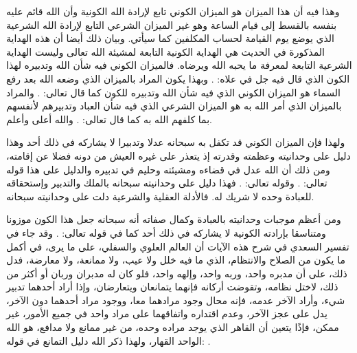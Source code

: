 وهذا فيه أن هذا الميزان هو الميزان الكوني تابع لإرادة الله الكونية وأن الله قائم عليه بنفسه بالقسط إلى قيام الساعة وهو غير الميزان الشرعي التابع لإرادة الله الشرعية الذي يوضع يوم القيامة لحساب المكلفين كما سيأتي. وبيان ذلك أيضا أن هذه الهداية المذكورة في الحديث هي الهداية الكونية التابعة لمشيئة الله تعالى وليست الهداية الشرعية التابعة لمعرفة ما يحبه الله ويرضاه. فالميزان الكوني فيه شأن الله وتدبيره لهذا الكون الذي قال فيه جل في علاه: \quranayah*[55][29]{\footnotesize \surahname*[55]}. وبهذا يكون المراد بالميزان الذي وضعه الله بعد رفع السماء هو الميزان الكوني الذي فيه شأن الله وتدبيره للكون كما قال تعالى: 
\quranayah*[55][7]{\footnotesize \surahname*[55]}. والمراد بالميزان الذي أمر الله به هو الميزان الشرعي الذي فيه شأن العباد وتدبيرهم لأنفسهم بما كلفهم الله به كما قال تعالى:
\quranayah*[55][8-9]{\footnotesize \surahname*[55]}. والله أعلى وأعلم.

ولهذا فإن الميزان الكوني قد تكفل به سبحانه عدلا وتدبيرا لا يشاركه في ذلك أحد وهذا دليل على وحدانيته وعظمته وقدرته إذ يتعذر على غيره العيش من دونه فضلا عن إقامته، ومن ذلك أن الله عدل في قضاءه ومشيئته وحليم في تدبيره والدليل على هذا قوله تعالى:
\quranayah*[35][41]{\footnotesize \surahname*[35]}. وقوله تعالى: \quranayah*[22][65]{\footnotesize \surahname*[22]}. فهذا دليل على وحدانيته سبحانه بالملك والتدبير وإستحقاقه للعبادة وحده لا شريك له. فالأدلة العقلية والشرعية دلت على وحدانيته سبحانه.

ومن أعظم موجبات وحدانيته بالعبادة وكمال صفاته أنه سبحانه جعل هذا الكون موزونا ومتناسقا بإرادته الكونية لا يشاركه في ذلك أحد كما في قوله تعالى: \quranayah*[21][22]{\footnotesize \surahname*[21]}. وقد جاء في تفسير السعدي في شرح هذه الآيات أن العالم العلوي والسفلي، على ما يرى، في أكمل ما يكون من الصلاح والانتظام، الذي ما فيه خلل ولا عيب، ولا ممانعة، ولا معارضة، فدل ذلك، على أن مدبره واحد، وربه واحد، وإلهه واحد، فلو كان له مدبران وربان أو أكثر من ذلك، لاختل نظامه، وتقوضت أركانه فإنهما يتمانعان ويتعارضان، وإذا أراد أحدهما تدبير شيء، وأراد الآخر عدمه، فإنه محال وجود مرادهما معا، ووجود مراد أحدهما دون الآخر، يدل على عجز الآخر، وعدم اقتداره واتفاقهما على مراد واحد في جميع الأمور، غير ممكن، فإذًا يتعين أن القاهر الذي يوجد مراده وحده، من غير ممانع ولا مدافع، هو الله الواحد القهار، ولهذا ذكر الله دليل التمانع في قوله: \quranayah*[23][91]{\footnotesize \surahname*[23]} \href{https://shamela.ws/book/42/1173#p4}{\faExternalLink} \cite{tafsir_Saadi}.

